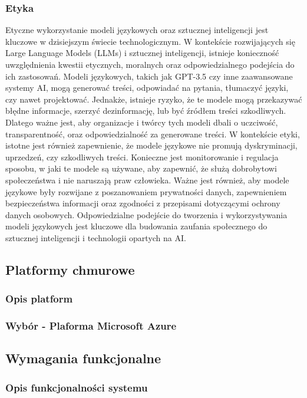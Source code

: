 \subsubsection{Etyka}
Etyczne wykorzystanie modeli językowych oraz sztucznej inteligencji jest kluczowe w dzisiejszym świecie technologicznym. W kontekście rozwijających się Large Language Models (LLMs) i sztucznej inteligencji, istnieje konieczność uwzględnienia kwestii etycznych, moralnych oraz odpowiedzialnego podejścia do ich zastosowań. Modeli językowych, takich jak GPT-3.5 czy inne zaawansowane systemy AI, mogą generować treści, odpowiadać na pytania, tłumaczyć języki, czy nawet projektować. Jednakże, istnieje ryzyko, że te modele mogą przekazywać błędne informacje, szerzyć dezinformację, lub być źródłem treści szkodliwych. Dlatego ważne jest, aby organizacje i twórcy tych modeli dbali o uczciwość, transparentność, oraz odpowiedzialność za generowane treści. W kontekście etyki, istotne jest również zapewnienie, że modele językowe nie promują dyskryminacji, uprzedzeń, czy szkodliwych treści. Konieczne jest monitorowanie i regulacja sposobu, w jaki te modele są używane, aby zapewnić, że służą dobrobytowi społeczeństwa i nie naruszają praw człowieka. Ważne jest również, aby modele językowe były rozwijane z poszanowaniem prywatności danych, zapewnieniem bezpieczeństwa informacji oraz zgodności z przepisami dotyczącymi ochrony danych osobowych. Odpowiedzialne podejście do tworzenia i wykorzystywania modeli językowych jest kluczowe dla budowania zaufania społecznego do sztucznej inteligencji i technologii opartych na AI.

\subsection{Platformy chmurowe}

\subsubsection{Opis platform}

\subsubsection{Wybór - Plaforma Microsoft Azure}

\subsection{Wymagania funkcjonalne}

\subsubsection{Opis funkcjonalności systemu}

